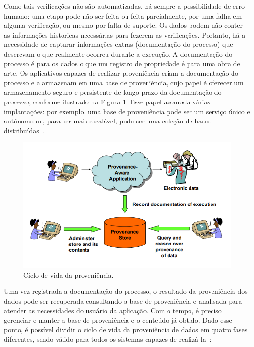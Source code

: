 \documentclass[portugues]{ic-tese}
\begin{document}
Como tais verificações não são automatizadas, há sempre a possibilidade de erro humano: uma etapa pode não ser feita ou feita parcialmente, por uma falha em alguma verificação, ou mesmo por falta de suporte. Os dados podem não conter as informações históricas necessárias para fezerem as verificações. Portanto, há a necessidade de capturar informações extras (documentação do processo) que descrevam o que realmente ocorreu durante a execução. A documentação do processo é para os dados o que um registro de propriedade é para uma obra de arte. Os aplicativos capazes de realizar proveniência criam a documentação do processo e a armazenam em uma base de proveniência, cujo papel é oferecer um armazenamento seguro e persistente de longo prazo da documentação do processo, conforme ilustrado na Figura \ref{fig:dataProvenanceSOA}. Esse papel acomoda várias implantações: por exemplo, uma base de proveniência pode ser um serviço único e autônomo ou, para ser mais escalável, pode ser uma coleção de bases distribuídas~\citep{Moreau_2008}.

\begin{figure}[h]
\centering
\includegraphics[scale=0.75]{images/provenance_lifecycle.png}
\caption {Ciclo de vida da proveniência.~\citep{Moreau_2008}}
\label{fig:dataProvenanceSOA}
\end{figure}

Uma vez registrada a documentação do processo, o resultado da proveniência dos dados pode ser recuperada consultando a base de proveniência e analisada para atender as necessidades do usuário da aplicação. Com o tempo, é preciso gerenciar e manter a base de proveniência e o conteúdo já obtido. Dado esse ponto, é possível dividir o ciclo de vida da proveniência de dados em quatro fases diferentes, sendo válido para todos os sistemas capazes de realizá-la~\citep{Moreau_2008}:
\end{document}

